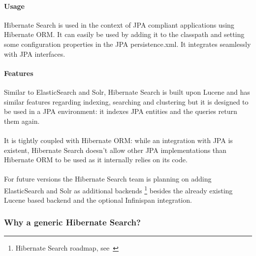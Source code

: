 \paragraph{Usage}
Hibernate Search is used in the context of JPA compliant applications using Hibernate ORM. It can easily be used by adding it to the classpath and setting some configuration properties in the JPA persistence.xml. It integrates seamlessly with JPA interfaces. 

\paragraph{Features}
Similar to ElasticSearch and Solr, Hibernate Search is built upon Lucene and has similar features regarding indexing, searching and clustering but it is designed to be used in a JPA environment: it indexes JPA entities and the queries return them again.
\\\\
It is tightly coupled with Hibernate ORM: while an integration with JPA is existent, Hibernate Search doesn't allow other JPA implementations than Hibernate ORM to be used as it internally relies on its code.
\\\\
For future versions the Hibernate Search team is planning on adding ElasticSearch and Solr as additional backends \footnote{Hibernate Search roadmap, see~\cite{hibernate_search_roadmap}} besides the already existing Lucene based backend and the optional Infinispan integration.

\pagebreak

\subsubsection{Why a generic Hibernate Search?}

